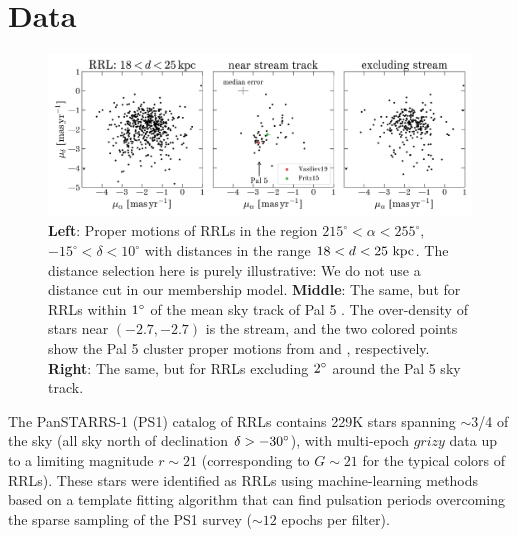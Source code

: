 \documentclass[twocolumn]{aastex63}
\newcommand{\sa}[1]{{\color{teal} SP: #1}}
\begin{document}
\section{Data} \label{sec:data}

\begin{figure}[t!]
\begin{center}
\includegraphics[width=\textwidth]{proper-motion.pdf}
\caption{\textbf{Left}: Proper motions of RRLs in the region $215^\circ < \alpha < 255^\circ$, $-15^\circ < \delta < 10^\circ$ with distances in the range $18 < d < 25~\mathrm{kpc}$.
The distance selection here is purely illustrative: We do not use a distance cut in our membership model.
\textbf{Middle}: The same, but for RRLs within $1\mbox{$^\circ$}$ of the mean sky track of Pal 5 \citep{Bonaca:2019}.
The over-density of stars near $(-2.7, -2.7)$ is the stream, and the two colored points show the Pal 5 cluster proper motions from \citet{Vasiliev:2019} and \citet{Fritz:2015}, respectively.
\textbf{Right}: The same, but for RRLs excluding $2\mbox{$^\circ$}$ around the Pal 5 sky track.}
\label{fig:pm}
\end{center}
\end{figure}

The PanSTARRS-1 (PS1) catalog of RRLs \citep{Sesar:2017b} contains 229K stars spanning $\sim$3/4 of the sky (all sky north of declination $\delta > -30\mbox{$^\circ$}$), with multi-epoch $grizy$ data up to a limiting magnitude $r\sim21$ (corresponding to $G \sim 21$ for the typical colors of RRLs). These stars were identified as RRLs using machine-learning methods based on a template fitting algorithm that can find pulsation periods overcoming the sparse sampling of the PS1 survey ($\sim12$ epochs per filter).
\end{document}
